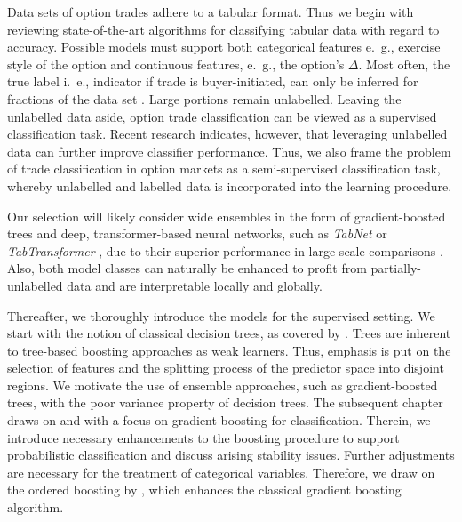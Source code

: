 Data sets of option trades adhere to a tabular format.  Thus we begin with reviewing state-of-the-art algorithms for classifying tabular data with regard to accuracy. Possible models must support both categorical features e.~g., exercise style of the option and continuous features, e.~g., the option's $\Delta$. Most often, the true label i.~e., indicator if trade is buyer-initiated, can only be inferred for fractions of the data set \autocites{grauerOptionTradeClassification2022}{savickasInferringDirectionOption2003}. Large portions remain unlabelled. Leaving the unlabelled data aside, option trade classification can be viewed as a supervised classification task. Recent research \autocites{arikTabNetAttentiveInterpretable2020}{huangTabTransformerTabularData2020}{yoonVIMEExtendingSuccess2020} indicates, however, that leveraging unlabelled data can further improve classifier performance. Thus, we also frame the problem of trade classification in option markets as a semi-supervised classification task, whereby unlabelled and labelled data is incorporated into the learning procedure. 

Our selection will likely consider wide ensembles in the form of gradient-boosted trees and deep, transformer-based neural networks, such as \textit{TabNet} \autocite{arikTabNetAttentiveInterpretable2020} or \textit{TabTransformer} \autocite{huangTabTransformerTabularData2020}, due to their superior performance in large scale comparisons \autocites{borisovDeepNeuralNetworks2022}{gorishniyRevisitingDeepLearning2021}{grinsztajnWhyTreebasedModels2022}{shwartz-zivTabularDataDeep2021}. Also, both model classes can naturally be enhanced to profit from partially-unlabelled data and are interpretable locally and globally. 

Thereafter, we thoroughly introduce the models for the supervised setting. We start with the notion of classical decision trees, as covered by \textcite{breimanClassificationRegressionTrees2017}. Trees are inherent to tree-based boosting approaches as weak learners. Thus, emphasis is put on the selection of features and the splitting process of the predictor space into disjoint regions. We motivate the use of ensemble approaches, such as gradient-boosted trees, with the poor variance property of decision trees. The subsequent chapter draws on \textcite{hastietrevorElementsStatisticalLearning2009} and \textcite{friedmanGreedyFunctionApproximation2001} with a focus on gradient boosting for classification. Therein, we introduce necessary enhancements to the boosting procedure to support probabilistic classification and discuss arising stability issues. Further adjustments are necessary for the treatment of categorical variables. Therefore, we draw on the ordered boosting by \textcite{prokhorenkovaCatBoostUnbiasedBoosting2018}, which enhances the classical gradient boosting algorithm.


